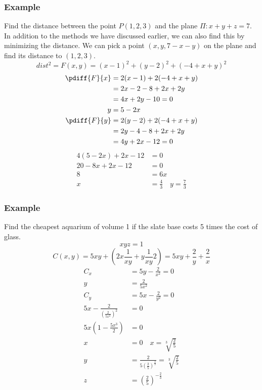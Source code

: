 \documentclass[letterpaper, 12pt]{math}
\begin{document}
\subsubsection*{Example}
Find the distance between the point \( P(1,2,3) \) and the plane \( \Pi: x+y+z
= 7 \). \\
In addition to the methods we have discussed earlier, we can also find this by
minimizing the distance. We can pick a point \( (x,y,7-x-y) \) on the plane
and find its distance to \( (1,2,3) \).
\[ dist^2 = F(x,y) = (x-1)^2+(y-2)^2+(-4+x+y)^2 \]
\begin{align*}
  \pdiff{F}{x} &= 2(x-1)+2(-4+x+y) \\
  &= 2x-2-8+2x+2y \\
  &= 4x+2y-10 = 0 \\
  y &= 5-2x \\
  \pdiff{F}{y} &= 2(y-2)+2(-4+x+y) \\
  &= 2y-4-8+2x+2y \\
  &= 4y+2x-12 = 0
\end{align*}
\begin{align*}
  4(5-2x)+2x-12 &= 0 \\
  20-8x+2x-12 &= 0 \\
  8 &= 6x \\
  x &= \frac{4}{3} \quad y = \frac{7}{3}
\end{align*}

\subsubsection*{Example}
Find the cheapest aquarium of volume 1 if the slate base costs 5 times the cost
of glass.
\[ xyz = 1 \]
\[ C(x,y) = 5xy+(2x\frac{1}{xy}+y\frac{1}{xy}2) = 5xy+\frac{2}{y}+\frac{2}{x} \]
\begin{align*}
  C_x &= 5y-\frac{2}{x^2} = 0 \\
  y &= \frac{2}{5x^2} \\
  C_y &= 5x-\frac{2}{y^2} = 0 \\
  5x-\frac{2}{(\frac{2}{5x^2})^2} &= 0 \\
  5x(1-\frac{5x^3}{2}) &= 0 \\
  x &= 0 \quad x = \sqrt[3]{\frac{2}{5}} \\
  y &= \frac{2}{5(\frac{2}{5})^{\frac{2}{3}}} = \sqrt[3]{\frac{2}{5}} \\
  z &= \left(\frac{2}{5}\right)^{-\frac{2}{3}}
\end{align*}
\end{document}
